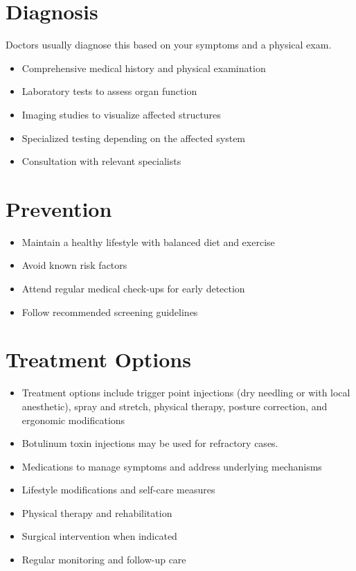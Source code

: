 \section{Diagnosis}
Doctors usually diagnose this based on your symptoms and a physical exam.

\begin{itemize}[noitemsep]
  \item Comprehensive medical history and physical examination
  \item Laboratory tests to assess organ function
  \item Imaging studies to visualize affected structures
  \item Specialized testing depending on the affected system
  \item Consultation with relevant specialists
\end{itemize}
\section{Prevention}
\begin{itemize}[noitemsep]
  \item Maintain a healthy lifestyle with balanced diet and exercise
  \item Avoid known risk factors
  \item Attend regular medical check-ups for early detection
  \item Follow recommended screening guidelines
\end{itemize}
\section{Treatment Options}
\begin{itemize}[noitemsep]
  \item Treatment options include trigger point injections (dry needling or with local anesthetic), spray and stretch, physical therapy, posture correction, and ergonomic modifications
  \item Botulinum toxin injections may be used for refractory cases.
  \item Medications to manage symptoms and address underlying mechanisms
  \item Lifestyle modifications and self-care measures
  \item Physical therapy and rehabilitation
  \item Surgical intervention when indicated
  \item Regular monitoring and follow-up care
\end{itemize}
